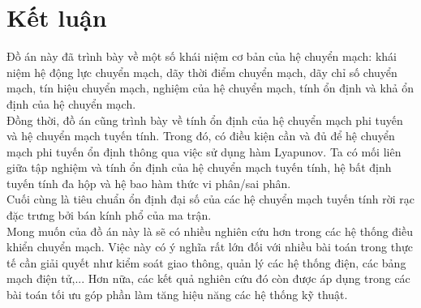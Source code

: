 \documentclass[14pt,a4paper,oneside]{report}		%
\theoremstyle{definition}
\begin{document}
\chapter*{Kết luận}
Đồ án này đã trình bày về một số khái niệm cơ bản của hệ chuyển mạch: khái niệm hệ động lực chuyển mạch, dãy thời điểm chuyển mạch, dãy chỉ số chuyển mạch, tín hiệu chuyển mạch, nghiệm của hệ chuyển mạch, tính ổn định và khả ổn định của hệ chuyển mạch.\\
Đồng thời, đồ án cũng trình bày về tính ổn định của hệ chuyển mạch phi tuyến và hệ chuyển mạch tuyến tính. Trong đó, có điều kiện cần và đủ để hệ chuyển mạch phi tuyến ổn định thông qua việc sử dụng hàm Lyapunov. Ta có mối liên giữa tập nghiệm và tính ổn định của hệ chuyển mạch tuyến tính, hệ bất định tuyến tính đa hộp và hệ bao hàm thức vi phân/sai phân.\\
Cuối cùng là tiêu chuẩn ổn định đại số của các hệ chuyển mạch tuyến tính rời rạc đặc trưng bởi bán kính phổ của ma trận.\\

Mong muốn của đồ án này là sẽ có nhiều nghiên cứu hơn trong các hệ thống điều khiển chuyển mạch. Việc này có ý nghĩa rất lớn đối với nhiều bài toán trong thực tế cần giải quyết như kiểm soát giao thông, quản lý các hệ thống điện, các bảng mạch điện tử,... Hơn nữa, các kết quả nghiên cứu đó còn được áp dụng trong các bài toán tối ưu góp phần làm tăng hiệu năng các hệ thống kỹ thuật.




\vfill
\end{document}
